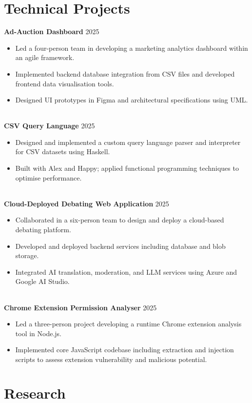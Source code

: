 \documentclass[11pt,a4paper]{article}
\begin{document}
\section{Technical Projects}
\textbf{Ad-Auction Dashboard} \hfill 2025
\begin{itemize}
    \item Led a four-person team in developing a marketing analytics dashboard within an agile framework.
    \item Implemented backend database integration from CSV files and developed frontend data visualisation tools.
    \item Designed UI prototypes in Figma and architectural specifications using UML.
\end{itemize}
\\
\textbf{CSV Query Language} \hfill 2025
\begin{itemize}
    \item Designed and implemented a custom query language parser and interpreter for CSV datasets using Haskell.
    \item Built with Alex and Happy; applied functional programming techniques to optimise performance.
\end{itemize}
\\
\textbf{Cloud-Deployed Debating Web Application} \hfill 2025
\begin{itemize}
    \item Collaborated in a six-person team to design and deploy a cloud-based debating platform.
    \item Developed and deployed backend services including database and blob storage.
    \item Integrated AI translation, moderation, and LLM services using Azure and Google AI Studio.
\end{itemize}
\\
\textbf{Chrome Extension Permission Analyser} \hfill 2025
\begin{itemize}
    \item Led a three-person project developing a runtime Chrome extension analysis tool in Node.js.
    \item Implemented core JavaScript codebase including extraction and injection scripts to assess extension vulnerability and malicious potential.
\end{itemize}

\section{Research}
\end{document}
